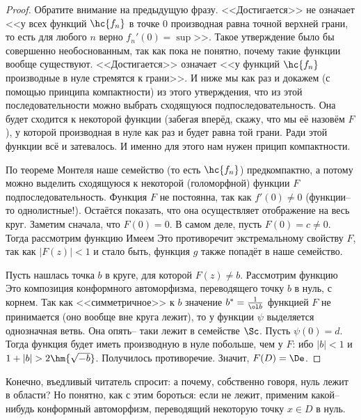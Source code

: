 \documentclass[a4paper]{article}
\begin{document}
\begin{proof}
Обратите внимание на предыдущую фразу. <<Достигается>> не означает <<у всех функций $\hc{f_n}$ в точке 0 производная равна точной верхней грани, то есть для любого $n$ верно $f_n'(0) = \sup$>>. Такое утверждение было бы совершенно необоснованным, так как пока не понятно, почему такие функции вообще существуют. <<Достигается>> означает <<у функций $\hc{f_n}$ производные в нуле стремятся к грани>>. И ниже мы как раз и докажем (с помощью принципа компактности) из этого утверждения, что из этой последовательности можно выбрать сходящуюся подпоследовательность. Она будет сходится к некоторой функции (забегая вперёд, скажу, что мы её назовём $F$), у которой производная в нуле как раз и будет равна той грани. Ради этой функции всё и затевалось. И именно для этого нам нужен прицип компактности.

По теореме Монтеля наше семейство (то есть $\hc{f_n}$) предкомпактно, а потому можно выделить сходящуюся к некоторой (голоморфной) функции $F$ подпоследовательность. Функция $F$ не постоянна, так как $f'(0)\neq 0$ (функции-- то однолистные!). Остаётся показать, что она осуществляет отображение на весь круг.
Заметим сначала, что $F(0)=0$. В самом деле, пусть $F(0)=c\neq 0$. Тогда рассмотрим функцию
Имеем
Это противоречит экстремальному свойству $F$, так как $|F(z)|< 1$ и стало быть, функция $g$ также попадёт в наше семейство.

Пусть нашлась точка $b$ в круге, для которой $F(z)\neq b$. Рассмотрим функцию
Это композиция конформного автоморфизма, переводящего точку $b$ в нуль, с корнем. Так как <<симметричное>> к $b$
значение $b^* = \frac{1}{\ol b}$ функцией $F$ не принимается (оно вообще вне круга лежит), то у функции $\psi$
выделяется однозначная ветвь. Она опять-- таки лежит в семействе $\Sc$. Пусть $\psi(0) = d$. Тогда
функция
будет иметь производную в нуле побольше, чем у $F$:
ибо $|b|<1$ и $1+|b|>2\hm{\sqrt{-b}}$. Получилось противоречие. Значит, $F(D) = \De$.
\end{proof}

\begin{note}
Конечно, въедливый читатель спросит: а почему, собственно говоря, нуль лежит в области? Но понятно, как с этим
бороться: если не лежит, применим какой-- нибудь конформный автоморфизм, переводящий некоторую точку $x\in D$ в нуль.
\end{note}
\end{document}
